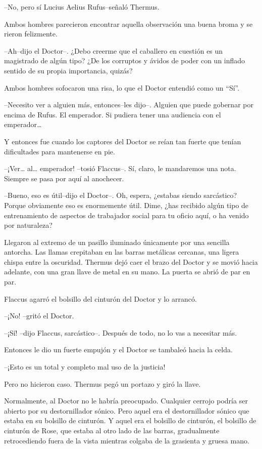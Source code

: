 --No, pero sí Lucius Aelius Rufus--señaló Thermus.

Ambos hombres parecieron encontrar aquella observación una buena broma y
se rieron felizmente.

--Ah--dijo el Doctor--. ¿Debo creerme que el caballero en cuestión es un
magistrado de algún tipo? ¿De los corruptos y ávidos de poder con un
inflado sentido de su propia importancia, quizás?

Ambos hombres sofocaron una risa, lo que el Doctor entendió como un
``Sí''.

--Necesito ver a alguien más, entonces--les dijo--. Alguien que puede
gobernar por encima de Rufus. El emperador. Si pudiera tener una
audiencia con el emperador\ldots{}

Y entonces fue cuando los captores del Doctor se reían tan fuerte que
tenían dificultades para mantenerse en pie.

--¡Ver\ldots{} al\ldots{} emperador! --tosió Flaccus--. Sí, claro, le
mandaremos una nota. Siempre se pasa por aquí al anochecer.

--Bueno, eso es útil--dijo el Doctor--. Oh, espera, ¿estabas siendo
sarcástico? Porque obviamente eso es enormemente útil. Dime, ¿has
recibido algún tipo de entrenamiento de aspectos de trabajador social
para tu oficio aquí, o ha venido por naturaleza?

Llegaron al extremo de un pasillo iluminado únicamente por una sencilla
antorcha. Las llamas crepitaban en las barras metálicas cercanas, una
ligera chispa entre la oscuridad. Thermus dejó caer el brazo del Doctor
y se movió hacia adelante, con una gran llave de metal en su mano. La
puerta se abrió de par en par.

Flaccus agarró el bolsillo del cinturón del Doctor y lo arrancó.

--¡No! --gritó el Doctor.

--¡Sí! --dijo Flaccus, sarcástico--. Después de todo, no lo vas a
necesitar más.

Entonces le dio un fuerte empujón y el Doctor se tambaleó hacia la
celda.

--¡Esto es un total y completo mal uso de la justicia!

Pero no hicieron caso. Thermus pegó un portazo y giró la llave.

Normalmente, al Doctor no le habría preocupado. Cualquier cerrojo podría
ser abierto por su destornillador sónico. Pero aquel era el
destornillador sónico que estaba en su bolsillo de cinturón. Y aquel era
el bolsillo de cinturón, el bolsillo de cinturón de Rose, que estaba al
otro lado de las barras, gradualmente retrocediendo fuera de la vista
mientras colgaba de la grasienta y gruesa mano.

